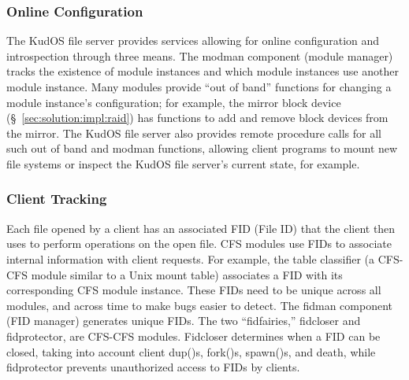 \subsubsection{Online Configuration}
\label{sec:solution:arch:online}


The KudOS file server provides services allowing for online configuration and
introspection through three means. The modman component (module manager)
tracks the existence of module instances and which module instances use
another module instance. Many modules provide ``out of band'' functions for
changing a module instance's configuration; for example, the mirror block
device (\S~\ref{sec:solution:impl:raid}) has functions to add and remove block
devices from the mirror. The KudOS file server also provides remote procedure
calls for all such out of band and modman functions, allowing client programs
to mount new file systems or inspect the KudOS file server's current state,
for example.

\subsubsection{Client Tracking}
\label{sec:solution:arch:clients}

Each file opened by a client has an associated FID (File ID) that the client
then uses to perform operations on the open file. CFS modules use FIDs to
associate internal information with client requests. For example, the table
classifier (a CFS-CFS module similar to a Unix mount table) associates a FID
with its corresponding CFS module instance. These FIDs need to be unique across
all modules, and across time to make bugs easier to detect. The fidman component
(FID manager) generates unique FIDs. The two ``fidfairies,'' fidcloser and
fidprotector, are CFS-CFS modules. Fidcloser determines when a FID can be
closed, taking into account client dup()s, fork()s, spawn()s, and death, while
fidprotector prevents unauthorized access to FIDs by clients.
